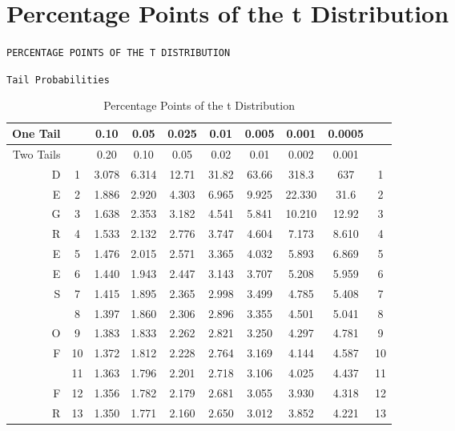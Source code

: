 \documentclass[12 pt, letterpaper]{letter}
\begin{document}
\chapter{Percentage Points of the t Distribution}
\begin{center}
\texttt{PERCENTAGE POINTS OF THE T DISTRIBUTION}
\end{center}
\texttt{Tail Probabilities}\\
\begin{table}[h]\caption{Percentage Points of the t Distribution}\label{Appendix}
\begin{center}\scriptsize
\begin{tabular}{|r|c|c|c|c|c|c|c|c|c|}
\hline One Tail & & 0.10 & 0.05 & 0.025 & 0.01 & 0.005 & 0.001 & 0.0005 &\\ 
\hline Two Tails & & 0.20 &   0.10 &   0.05 &   0.02  &  0.01  &  0.002 & 0.001 & \\ 
\hline D  & 1 &   3.078  & 6.314 & 12.71  & 31.82  & 63.66 & 318.3  & 637 & 1  \\ 
\hline E  & 2 &   1.886  & 2.920 &  4.303 &  6.965 &  9.925 & 22.330 & 31.6 & 2 \\ 
\hline G  & 3 &   1.638  & 2.353 &  3.182 &  4.541 &  5.841 & 10.210 & 12.92  &   3  \\ 
\hline R  & 4 &   1.533  & 2.132 &  2.776 &  3.747 &  4.604 &  7.173 &  8.610 &   4  \\ 
\hline E  & 5 &   1.476 &  2.015 &  2.571 &  3.365 &  4.032 &  5.893 &  6.869 &   5 \\ 
\hline E  & 6 &   1.440 &  1.943 &  2.447 &  3.143 &  3.707 &  5.208 &  5.959 &   6  \\ 
\hline S  & 7 &   1.415 &  1.895 &  2.365 &  2.998 &  3.499 &  4.785 &  5.408 &   7  \\ 
\hline    & 8 &   1.397 &  1.860 &  2.306 &  2.896 &  3.355 &  4.501 &  5.041 &   8  \\ 
\hline O  & 9 &   1.383 &  1.833 &  2.262 &  2.821 &  3.250 &  4.297 &  4.781 &   9  \\ 
\hline F  &10 &   1.372 &  1.812 &  2.228 &  2.764 &  3.169 &  4.144 &  4.587 &  10 \\ 
\hline    &11 &   1.363 &  1.796 &  2.201 &  2.718 &  3.106 &  4.025 &  4.437 &  11  \\ 
\hline F  &12 &   1.356 &  1.782 &  2.179 &  2.681 &  3.055 &  3.930 &  4.318 &  12  \\ 
\hline R  &13 &   1.350 &  1.771 &  2.160 &  2.650 &  3.012 &  3.852 &  4.221 &  13  \\ 

\end{tabular}
\end{center}
\end{table}
\end{document}
